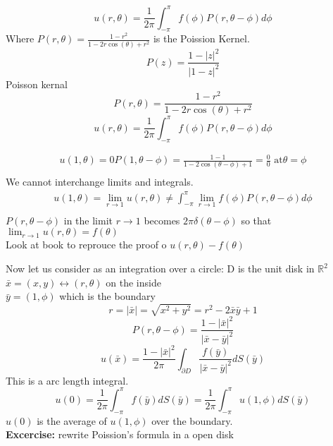 \documentclass[answers, 12pts,addpoints]{exam}
\begin{document}
$$ u(r,\theta) = \frac{1}{2\pi} \int_{-\pi}^{\pi} f(\phi) P(r,\theta - \phi) d\phi$$
Where $P(r,\theta) = \frac{1 - r^2}{1 - 2r\cos(\theta) + r^2}$ is the Poission Kernel.\\
$$P(z) = \frac{1 - |z|^2}{|1-z|^2}$$
Poisson kernal 
$$ P(r, \theta) = \frac{1 - r^2}{1 - 2r\cos(\theta) + r^2}$$
$$u(r, \theta) = \frac{1}{2\pi} \int_{-\pi}^{\pi} f(\phi) P(r, \theta - \phi) d\phi$$
\begin{remark}
    \begin{align*}
        u(1, \theta) = 0 
        P(1, \theta - \phi) = \frac{1 - 1}{1 - 2\cos(\theta - \phi) + 1} = \frac{0}{0} \text{ at} \theta = \phi\\
    \end{align*}
    We cannot interchange limits and integrals.\\
    \begin{align*}
        u(1,\theta) = \lim_{r \to 1} u(r,\theta) \neq \int_{-\pi}^{\pi} \lim_{r \to 1} f(\phi) P(r, \theta - \phi) d\phi\\
    \end{align*}
    $P(r, \theta - \phi)$ in the limit $r \to 1$ becomes $2\pi \delta(\theta - \phi)$ so that $\lim_{r \to 1} u(r,\theta) = f(\theta)$\\
    Look at book to reprouce the proof o $u(r,\theta) - f(\theta)$
\end{remark}
Now let us consider as an integration over a circle:
D is the unit disk in $\mathbb{R}^2$\\
$\bar{x} = (x,y) \leftrightarrow (r, \theta)$ on the inside\\
$\bar{y} = (1, \phi)$ which is the boundary\\
$$r = |\bar{x}| = \sqrt{x^2 + y^2} = r^2 -2\bar{x}\bar{y} + 1$$
$$P(r, \theta - \phi) = \frac{1 - |\bar{x}|^2}{|\bar{x} - \bar{y}|^2}$$
$$u(\bar{x}) = \frac{1 - |\bar{x}|^2}{2\pi} \int_{\partial D} \frac{f(\bar{y})}{|\bar{x} - \bar{y}|^2} dS(\bar{y})$$
This is a arc length integral.\\
$$ u(0) = \frac{1}{2\pi} \int_{-\pi}^{\pi} f(\bar{y}) dS(\bar{y}) = \frac{1}{2\pi} \int_{-\pi}^{\pi} u(1,\phi) dS(\bar{y})$$
$u(0)$ is the average of $u(1,\phi)$ over the boundary.\\
\textbf{Excercise:} rewrite Poission's formula in a open disk\\
\end{document}
